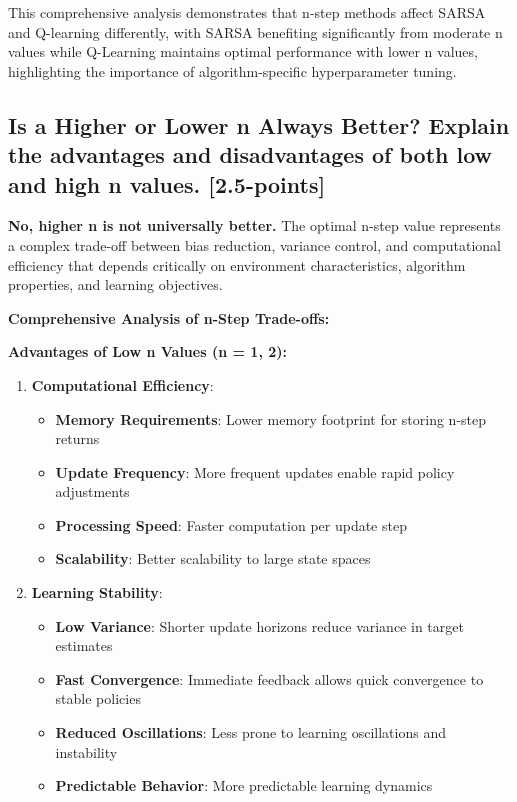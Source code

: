 \documentclass[12pt]{article}
\begin{document}
{{{This comprehensive analysis demonstrates that n-step methods affect SARSA and Q-learning differently, with SARSA benefiting significantly from moderate n values while Q-Learning maintains optimal performance with lower n values, highlighting the importance of algorithm-specific hyperparameter tuning.

\subsection{Is a Higher or Lower n Always Better? Explain the advantages and disadvantages of both low and high n values. [2.5-points]}

\textbf{No, higher n is not universally better.} The optimal n-step value represents a complex trade-off between bias reduction, variance control, and computational efficiency that depends critically on environment characteristics, algorithm properties, and learning objectives.

\textbf{Comprehensive Analysis of n-Step Trade-offs:}

\textbf{Advantages of Low n Values (n = 1, 2):}

\begin{enumerate}
    \item \textbf{Computational Efficiency}:
    \begin{itemize}
        \item \textbf{Memory Requirements}: Lower memory footprint for storing n-step returns
        \item \textbf{Update Frequency}: More frequent updates enable rapid policy adjustments
        \item \textbf{Processing Speed}: Faster computation per update step
        \item \textbf{Scalability}: Better scalability to large state spaces
    \end{itemize}
    
    \item \textbf{Learning Stability}:
    \begin{itemize}
        \item \textbf{Low Variance}: Shorter update horizons reduce variance in target estimates
        \item \textbf{Fast Convergence}: Immediate feedback allows quick convergence to stable policies
        \item \textbf{Reduced Oscillations}: Less prone to learning oscillations and instability
        \item \textbf{Predictable Behavior}: More predictable learning dynamics
    \end{itemize}
    

\end{enumerate}}}}
\end{document}
